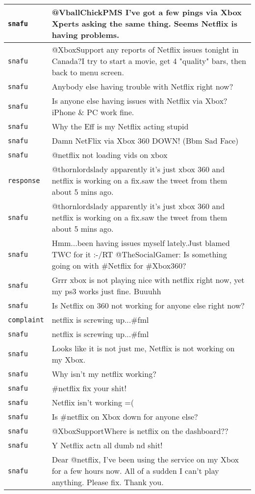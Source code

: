 \begin{center}
\begin{longtable}{|l|p{120mm}|}
         \texttt{snafu} & @VballChickPMS I've got a few pings via Xbox Xperts asking the same thing. Seems Netflix is having problems.
      \tabularnewline\hline
         \texttt{snafu} & @XboxSupport any reports of Netflix issues tonight in Canada?I try to start a movie, get 4 "quality" bars, then back to menu screen.
      \tabularnewline\hline
         \texttt{snafu} & Anybody else having trouble with Netflix right now?
      \tabularnewline\hline
         \texttt{snafu} & Is anyone else having issues with Netflix via Xbox? iPhone \& PC work fine.
      \tabularnewline\hline
         \texttt{snafu} & Why the Eff is my Netflix acting stupid
      \tabularnewline\hline
         \texttt{snafu} & Damn NetFlix via Xbox 360 DOWN! (Bbm Sad Face)
      \tabularnewline\hline
         \texttt{snafu} & @netflix not loading vids on xbox
      \tabularnewline\hline
         \texttt{response} & @thornlordslady apparently it's just xbox 360 and netflix is working on a fix.saw the tweet from them about 5 mins ago.
      \tabularnewline\hline
         \texttt{snafu} & @thornlordslady apparently it's just xbox 360 and netflix is working on a fix.saw the tweet from them about 5 mins ago.
      \tabularnewline\hline
         \texttt{snafu} & Hmm...been having issues myself lately.Just blamed TWC for it :-/RT @TheSocialGamer: Is something going on with \#Netflix for \#Xbox360?
      \tabularnewline\hline
         \texttt{snafu} & Grrr xbox is not playing nice with netflix right now, yet my ps3 works just fine. Buuuhh
      \tabularnewline\hline
         \texttt{snafu} & Is Netflix on 360 not working for anyone else right now?
      \tabularnewline\hline
         \texttt{complaint} & netflix is screwing up...\#fml
      \tabularnewline\hline
         \texttt{snafu} & netflix is screwing up...\#fml
      \tabularnewline\hline
         \texttt{snafu} & Looks like it is not just me, Netflix is not working on my Xbox.
      \tabularnewline\hline
         \texttt{snafu} & Why isn't my netflix working?
      \tabularnewline\hline
         \texttt{snafu} & \#netflix fix your shit!
      \tabularnewline\hline
         \texttt{snafu} & Netflix isn't working =(
      \tabularnewline\hline
         \texttt{snafu} & Is \#netflix on Xbox down for anyone else?
      \tabularnewline\hline
         \texttt{snafu} & @XboxSupportWhere is netflix on the dashboard??
      \tabularnewline\hline
         \texttt{snafu} & Y Netflix actn all dumb nd shit!
      \tabularnewline\hline
         \texttt{snafu} & Dear @netflix, I've been using the service on my Xbox for a few hours now. All of a sudden I can't play anything. Please fix. Thank you.

\end{longtable}
\end{center}
